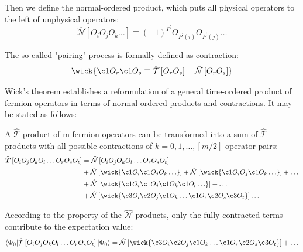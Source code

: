 Then we define the normal-ordered product, which puts all physical operators to the left of unphysical operators:
\begin{equation}
	\hat{\mathcal{N}}\left[O_{i} O_{j} O_{k} \ldots\right] \equiv(-1)^{P^{\prime}} O_{P^{\prime}(i)} O_{P^{\prime}(j)} \ldots
\end{equation}

The so-called "pairing" process is formally defined as contraction:
\begin{equation}
	\wick{
		\c1 O_{r} \c1 O_{s} \equiv \hat{\mathcal{T}}\left[O_{r} O_{s}\right]-\hat{\mathcal{N}}\left[O_{r} O_{s}\right]
	}
\end{equation}

Wick's theorem \cite{wickproof} establishes a reformulation of a general time-ordered product
of fermion operators in terms of normal-ordered products and contractions. It may be stated as follows:

A $\hat{\mathcal{T}}$ product of m fermion operators can be transformed into a sum of $\hat{\mathcal{T}}$ products with all possible contractions of $k = 0, 1, \dots, [m/2]$ operator pairs:
\begin{equation}
	\begin{aligned}
		\hat{\boldsymbol{T}}\left[O_{i} O_{j} O_{k} O_{l} \ldots O_{r} O_{s} O_{t}\right]&=
		\hat{\mathcal{N}}\left[O_{i} O_{j} O_{k} O_{l} \ldots O_{r} O_{s} O_{t}\right]
		\\
		&+\hat{\mathcal{N}}\left[\wick{\c1 O_{i} \c1 O_{j} O_{k} \ldots}\right] +\hat{\mathcal{N}}\left[\wick{\c1 O_{i} O_{j} \c1 O_{k} \ldots}\right]+\ldots
		\\
		&+\hat{\mathcal{N}}\left[\wick{\c1 O_{i} \c1 O_{j} \c1 O_{k} \c1 O_{l} \ldots}\right]+\ldots
		\\
		&+\hat{\mathcal{N}}\left[\wick{\c3 O_{i} \c2 O_{j} \c1 O_{k} \ldots \c1 O_{r} \c2 O_{s} \c3 O_{t}}\right] \ldots
	\end{aligned}
\end{equation}

According to the property of the $\hat{\mathcal{N}}$ products, only the fully contracted terms contribute to the expectation value:
\begin{equation}
	\langle\Phi_{0}|
	\hat{\mathcal{T}}\left[O_{i} O_{j} O_{k} O_{l} \ldots O_{r} O_{s} O_{t}\right]
	| \Phi_{0}\rangle
	=\hat{\mathcal{N}}\left[\wick{\c3 O_{i} \c2 O_{j} \c1 O_{k} \ldots \c1  O_{r} \c2 O_{s} \c3 O_{t}}\right]+\ldots
\end{equation}

